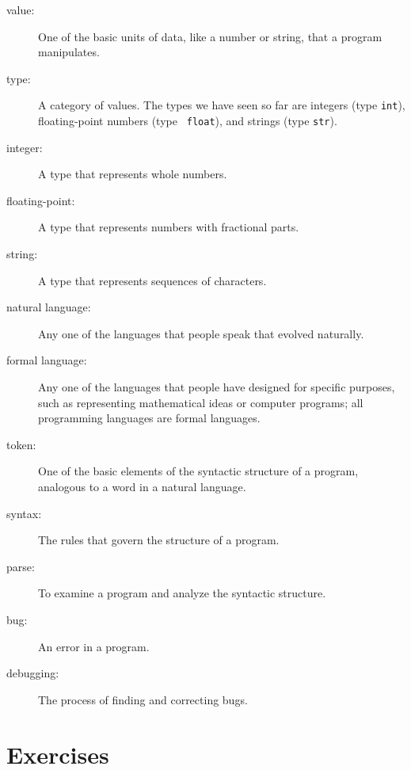 \begin{description}
\item[value:]  One of the basic units of data, like a number or string, 
that a program manipulates.

\item[type:] A category of values. The types we have seen so far
are integers (type {\tt int}), floating-point numbers (type {\tt
float}), and strings (type {\tt str}).

\item[integer:] A type that represents whole numbers.

\item[floating-point:] A type that represents numbers with fractional
parts.

\item[string:] A type that represents sequences of characters.

\item[natural language:]  Any one of the languages that people speak that
evolved naturally.

\item[formal language:]  Any one of the languages that people have designed
for specific purposes, such as representing mathematical ideas or
computer programs; all programming languages are formal languages.

\item[token:]  One of the basic elements of the syntactic structure of
a program, analogous to a word in a natural language.

\item[syntax:] The rules that govern the structure of a program.

\item[parse:] To examine a program and analyze the syntactic structure.

\item[bug:] An error in a program.

\item[debugging:] The process of finding and correcting bugs.

\end{description}


\section{Exercises}

